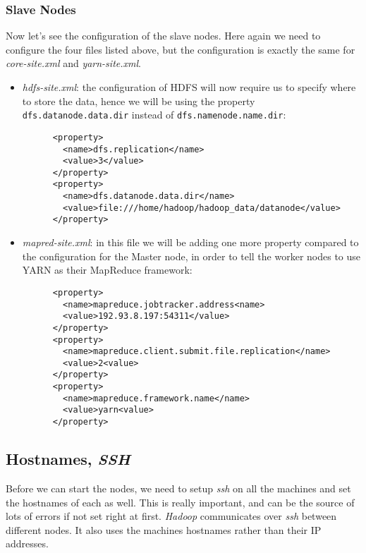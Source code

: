 \documentclass[a4paper, 12pt]{article}
\begin{document}
    \subsubsection{Slave Nodes}

Now let's see the configuration of the slave nodes. Here again we need to configure the four files listed above, but the configuration is exactly the same for \textit{core-site.xml} and \textit{yarn-site.xml}.
    
\begin{itemize}
  \item \textit{hdfs-site.xml}: the configuration of HDFS will now require us to specify where to store the data, hence we will be using the property \texttt{dfs.datanode.data.dir} instead of \texttt{dfs.namenode.name.dir}:
    \lstset{language=xml}
    \begin{lstlisting}
      <property>
        <name>dfs.replication</name>
        <value>3</value>
      </property>
      <property>
        <name>dfs.datanode.data.dir</name>
        <value>file:///home/hadoop/hadoop_data/datanode</value>
      </property>
    \end{lstlisting}
  \item \textit{mapred-site.xml}: in this file we will be adding one more property compared to the configuration for the Master node, in order to tell the worker nodes to use YARN as their MapReduce framework:
    \lstset{language=xml}
    \begin{lstlisting}
      <property>
        <name>mapreduce.jobtracker.address<name>
        <value>192.93.8.197:54311</value>
      </property>
      <property>
        <name>mapreduce.client.submit.file.replication</name>
        <value>2<value>
      </property>
      <property>
        <name>mapreduce.framework.name</name>
        <value>yarn<value>
      </property>
    \end{lstlisting}
\end{itemize}
    
  
  \subsection{Hostnames, \textit{SSH}}
  
Before we can start the nodes, we need to setup \textit{ssh} on all the machines and set the hostnames of each as well. This is really important, and can be the source of lots of errors if not set right at first. \textit{Hadoop} communicates over \textit{ssh} between different nodes. It also uses the machines hostnames rather than their IP addresses.
\end{document}
